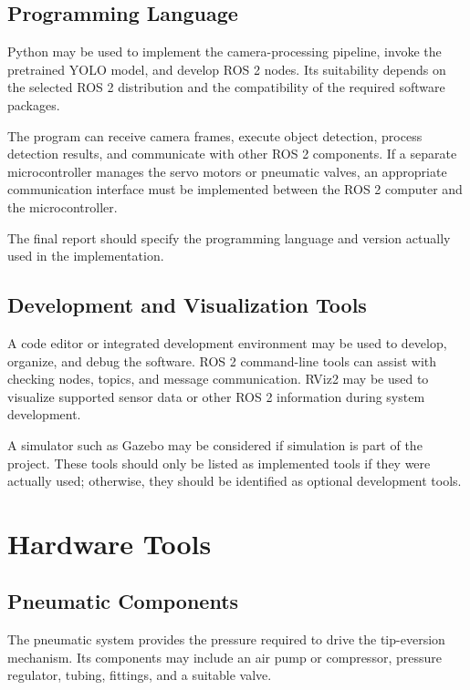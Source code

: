 \subsection{Programming Language}

Python may be used to implement the camera-processing pipeline, invoke the pretrained YOLO model, and develop ROS 2 nodes. Its suitability depends on the selected ROS 2 distribution and the compatibility of the required software packages.

The program can receive camera frames, execute object detection, process detection results, and communicate with other ROS 2 components. If a separate microcontroller manages the servo motors or pneumatic valves, an appropriate communication interface must be implemented between the ROS 2 computer and the microcontroller.

The final report should specify the programming language and version actually used in the implementation.

\subsection{Development and Visualization Tools}

A code editor or integrated development environment may be used to develop, organize, and debug the software. ROS 2 command-line tools can assist with checking nodes, topics, and message communication. RViz2 may be used to visualize supported sensor data or other ROS 2 information during system development.

A simulator such as Gazebo may be considered if simulation is part of the project. These tools should only be listed as implemented tools if they were actually used; otherwise, they should be identified as optional development tools.

\section{Hardware Tools}

\subsection{Pneumatic Components}

The pneumatic system provides the pressure required to drive the tip-eversion mechanism. Its components may include an air pump or compressor, pressure regulator, tubing, fittings, and a suitable valve.

